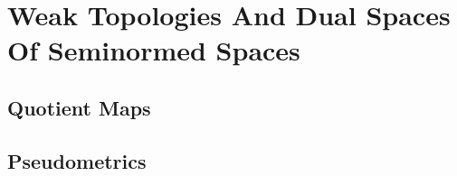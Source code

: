 \section{Weak Topologies And Dual Spaces Of Seminormed Spaces}
\subsection{Quotient Maps}










 



 









\subsection{Pseudometrics}













